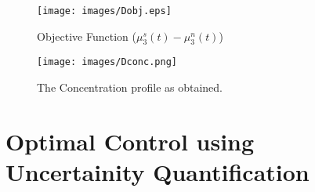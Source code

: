 \documentclass[3p,times,authoryear]{elsarticle}
\begin{document}
\begin{figure}[h!] 
\begin{center} 
\texttt{[image: images/Dobj.eps]}
\end{center}
\caption{Objective Function ($\mu_{3}^{s}(t) - \mu_{3}^{n}(t)$)} \label{Dobj}
\end{figure}

\begin{figure}[h!] 

\begin{center} 
\texttt{[image: images/Dconc.png]}
\end{center}
\caption{The Concentration profile as obtained.} \label{Dconc}
\end{figure}

\section{Optimal Control using Uncertainity Quantification}
\end{document}
